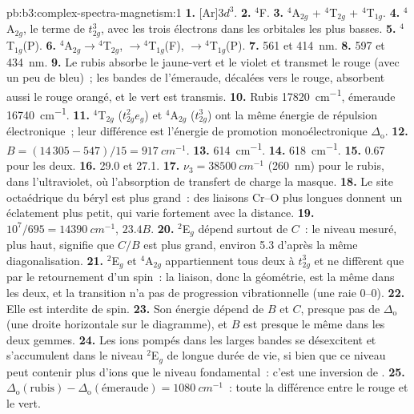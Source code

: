 \begin{solution}{pb:b3:complex-spectra-magnetism:1}
\textbf{1.} [Ar]$3d^3$.
\textbf{2.} $^4$F.
\textbf{3.} $^4$A$_{2g}$ + $^4$T$_{2g}$ + $^4$T$_{1g}$.
\textbf{4.} $^4$A$_{2g}$, le terme de $t_{2g}^3$, avec les trois électrons dans les orbitales les plus basses.
\textbf{5.} $^4$T$_{1g}$(P).
\textbf{6.} $^4$A$_{2g}\to{}^4$T$_{2g}$, $\to{}^4$T$_{1g}$(F), $\to{}^4$T$_{1g}$(P).
\textbf{7.} 561 et \qty{414}{nm}.
\textbf{8.} 597 et \qty{434}{nm}.
\textbf{9.} Le rubis absorbe le jaune-vert et le violet et transmet le rouge
(avec un peu de bleu)~; les bandes de l'émeraude, décalées vers le rouge,
absorbent aussi le rouge orangé, et le vert est transmis.
\textbf{10.} Rubis \qty{17820}{cm^{-1}}, émeraude \qty{16740}{cm^{-1}}.
\textbf{11.} $^4$T$_{2g}$ ($t_{2g}^2e_g$) et $^4$A$_{2g}$ ($t_{2g}^3$) ont la même énergie de répulsion électronique~; leur
différence est l'énergie de promotion monoélectronique $\Delta_{\mathrm o}$.
\textbf{12.} $B = (14\,305 - 547)/15 = \qty{917}{cm^{-1}}$.
\textbf{13.} \qty{614}{cm^{-1}}.
\textbf{14.} \qty{618}{cm^{-1}}.
\textbf{15.} 0.67 pour les deux.
\textbf{16.} 29.0 et 27.1.
\textbf{17.} $\nu_3 = \qty{38500}{cm^{-1}}$ (\qty{260}{nm}) pour le rubis, dans l'ultraviolet, où l'absorption
de transfert de charge la masque.
\textbf{18.} Le site octaédrique du béryl est plus grand~: des liaisons Cr--O
plus longues donnent un éclatement plus petit, qui varie fortement avec la
distance.
\textbf{19.} $10^7/695 = \qty{14390}{cm^{-1}}$, $23.4B$.
\textbf{20.} $^2$E$_g$ dépend surtout de $C$~: le niveau mesuré, plus haut, signifie que $C/B$ est plus grand,
environ 5.3 d'après la même diagonalisation.
\textbf{21.} $^2$E$_g$ et $^4$A$_{2g}$ appartiennent tous deux à $t_{2g}^3$ et ne diffèrent que par le retournement d'un spin~: la liaison,
donc la géométrie, est la même dans les deux, et la transition n'a pas de
progression vibrationnelle (une raie 0--0).
\textbf{22.} Elle est interdite de spin.
\textbf{23.} Son énergie dépend de $B$ et $C$, presque pas de $\Delta_{\mathrm o}$ (une droite horizontale sur le diagramme),
et $B$ est presque le même dans les deux gemmes.
\textbf{24.} Les ions pompés dans les larges bandes se désexcitent et
s'accumulent dans le niveau $^2$E$_g$ de longue durée de vie, si bien que
ce niveau peut contenir plus d'ions que le niveau fondamental~: c'est une
inversion de .
\textbf{25.} \textbf{$\Delta_{\mathrm o}(\text{rubis}) - \Delta_{\mathrm o}(\text{émeraude}) = \qty{1080}{cm^{-1}}$}~: toute la différence entre le rouge et
le vert.
\end{solution}
